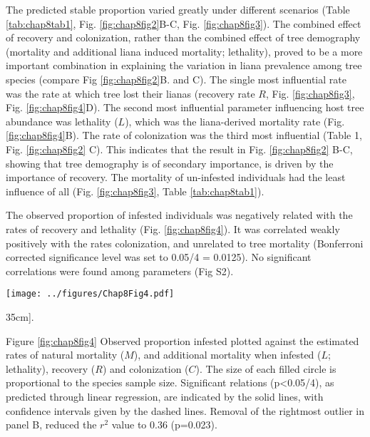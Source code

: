 \documentclass[b5paper,justified]{tufte-book} %
\begin{document}
\begin{fullwidth}
The predicted stable proportion varied greatly under different scenarios (Table \ref{tab:chap8tab1}, Fig. \ref{fig:chap8fig2}B-C, Fig. \ref{fig:chap8fig3}). The combined effect of recovery and colonization, rather than the combined effect of tree demography (mortality and additional liana induced mortality; lethality), proved to be a more important combination in explaining the variation in liana prevalence among tree species (compare Fig \ref{fig:chap8fig2}B. and C). The single most influential rate was the rate at which tree lost their lianas (recovery rate $R$, Fig. \ref{fig:chap8fig3}, Fig. \ref{fig:chap8fig4}D). The second most influential parameter influencing host tree abundance was lethality ($L$), which was the liana-derived mortality rate (Fig. \ref{fig:chap8fig4}B). The rate of colonization was the third most influential (Table 1, Fig. \ref{fig:chap8fig2} C). This indicates that the result in Fig. \ref{fig:chap8fig2} B-C, showing that tree demography is of secondary importance, is driven by the importance of recovery. The mortality of un-infested individuals had the least influence of all (Fig. \ref{fig:chap8fig3}, Table \ref{tab:chap8tab1}). 

The observed proportion of infested individuals was negatively related with the rates of recovery and lethality (Fig. \ref{fig:chap8fig4}). It was correlated weakly positively with the rates colonization, and unrelated to tree mortality (Bonferroni corrected significance level was set to 0.05/4 = 0.0125). No significant correlations were found among parameters (Fig S2). 


\begin{figure*}
\hspace*{.3cm}\texttt{[image: ../figures/Chap8Fig4.pdf]}
\caption[The effects of liana infestation on expected demographic rates as a function of tree size][35cm]{.}
\label{fig:chap8fig4}
\hspace*{1cm}\begin{minipage}{12cm}
\vspace*{0.1cm}
\footnotesize Figure \ref{fig:chap8fig4} 
Observed proportion infested plotted against the estimated rates of natural mortality ($M$), and additional mortality when infested ($L$; lethality), recovery ($R$) and colonization ($C$). The size of each filled circle is proportional to the species sample size. Significant relations (p<0.05/4), as predicted through linear regression, are indicated by the solid lines, with confidence intervals given by the dashed lines. Removal of the rightmost outlier in panel B, reduced the $r^2$ value to 0.36 (p=0.023).
\end{minipage}
\end{figure*}



\end{fullwidth}
\end{document}
